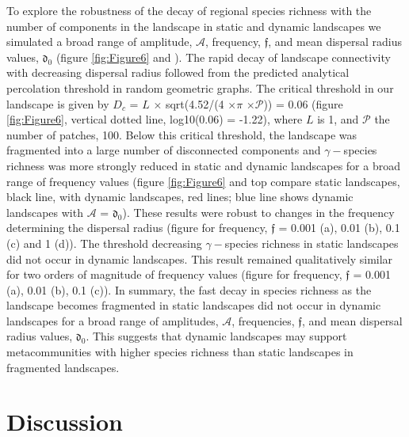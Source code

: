 \documentclass[a4paper,12pt]{article}
\begin{document}
To explore the robustness of the decay of regional species richness with the number of components in the landscape in static and dynamic landscapes we simulated a broad range of amplitude, $\mathcal{A}$, frequency, $\mathfrak{f}$, and mean dispersal radius values, $\mathfrak{d_{0}}$ (figure \ref{fig:Figure6} and ). The rapid decay of landscape connectivity with decreasing dispersal radius followed from the predicted analytical percolation threshold in random geometric graphs. The critical threshold in our landscape is given by $D_c$ = $L$ $\times$ sqrt(4.52/(4 $\times$$\pi$ $\times$$\mathcal{P}$)) = 0.06 (figure \ref{fig:Figure6}, vertical dotted line, log10(0.06) = -1.22), where $L$ is 1, and $\mathcal{P}$ the number of patches, 100. Below this critical threshold, the landscape was fragmented into a large number of disconnected components and $\gamma-$species richness was more strongly reduced in static and dynamic landscapes for a broad range of frequency values (figure \ref{fig:Figure6} and  top compare static landscapes, black line, with dynamic landscapes, red lines; blue line shows dynamic landscapes with $\mathcal{A}$ = $\mathfrak{d_{0}}$). These results were robust to changes in the frequency determining the dispersal radius (figure  for frequency, $\mathfrak{f}$ = 0.001 (a), 0.01 (b), 0.1 (c) and 1 (d)). The threshold decreasing $\gamma-$species richness in static landscapes did not occur in dynamic landscapes. This result remained qualitatively similar for two orders of magnitude of frequency values (figure  for frequency, $\mathfrak{f}$ = 0.001 (a), 0.01 (b), 0.1 (c)). In summary, the fast decay in species richness as the landscape becomes fragmented in static landscapes did not occur in dynamic landscapes for a broad range of amplitudes, $\mathcal{A}$, frequencies, $\mathfrak{f}$, and mean dispersal radius values, $\mathfrak{d_{0}}$. This suggests that dynamic landscapes may support metacommunities with higher species richness than static landscapes in fragmented landscapes.
    
\section*{Discussion}
\end{document}
